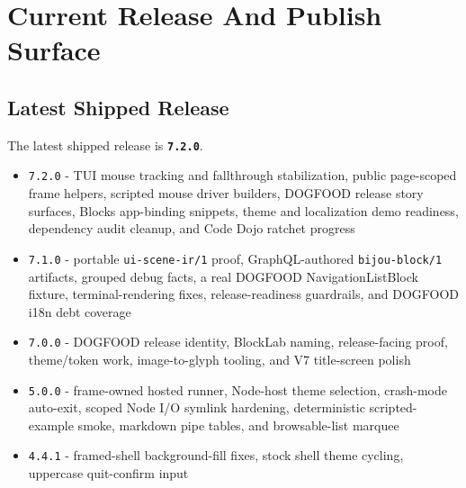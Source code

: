 \section{Current Release And Publish Surface}\label{record-274-current-release-and-publish-surface}

\subsection{Latest Shipped Release}\label{record-274-latest-shipped-release}

The latest shipped release is \textbf{\texttt{7\allowbreak{}.\allowbreak{}2\allowbreak{}.\allowbreak{}0}}.

\begin{itemize}
\tightlist
\item
  \texttt{7\allowbreak{}.\allowbreak{}2\allowbreak{}.\allowbreak{}0} - TUI mouse tracking and fallthrough stabilization, public page-scoped frame helpers, scripted mouse driver builders, DOGFOOD release story surfaces, Blocks app-binding snippets, theme and localization demo readiness, dependency audit cleanup, and Code Dojo ratchet progress
\item
  \texttt{7\allowbreak{}.\allowbreak{}1\allowbreak{}.\allowbreak{}0} - portable \texttt{u\allowbreak{}i\allowbreak{}-\allowbreak{}s\allowbreak{}c\allowbreak{}e\allowbreak{}n\allowbreak{}e\allowbreak{}-\allowbreak{}i\allowbreak{}r\allowbreak{}/\allowbreak{}1} proof, GraphQL-authored \texttt{b\allowbreak{}i\allowbreak{}j\allowbreak{}o\allowbreak{}u\allowbreak{}-\allowbreak{}b\allowbreak{}l\allowbreak{}o\allowbreak{}c\allowbreak{}k\allowbreak{}/\allowbreak{}1} artifacts, grouped debug facts, a real DOGFOOD NavigationListBlock fixture, terminal-rendering fixes, release-readiness guardrails, and DOGFOOD i18n debt coverage
\item
  \texttt{7\allowbreak{}.\allowbreak{}0\allowbreak{}.\allowbreak{}0} - DOGFOOD release identity, BlockLab naming, release-facing proof, theme/token work, image-to-glyph tooling, and V7 title-screen polish
\item
  \texttt{5\allowbreak{}.\allowbreak{}0\allowbreak{}.\allowbreak{}0} - frame-owned hosted runner, Node-host theme selection, crash-mode auto-exit, scoped Node I/O symlink hardening, deterministic scripted-example smoke, markdown pipe tables, and browsable-list marquee
\item
  \texttt{4\allowbreak{}.\allowbreak{}4\allowbreak{}.\allowbreak{}1} - framed-shell background-fill fixes, stock shell theme cycling, uppercase quit-confirm input

\end{itemize}
